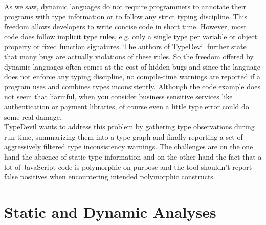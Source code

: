 \documentclass[runningheads,a4paper]{llncs}
\begin{document}
As we saw, dynamic languages do not require programmers to annotate their programs with type information or to follow any strict typing discipline. 
This freedom allows developers to write concise code in short time. 
However, most code does follow implicit type rules, e.g. only a single type per variable or object property or fixed function signatures.
The authors of TypeDevil further state that many bugs are actually violations of these rules.
So the freedom offered by dynamic languages often comes at the cost of hidden bugs and since the language does not enforce any typing discipline, no compile-time warnings are reported if a program uses and combines types inconsistently.
Although the code example does not seem that harmful, when you consider business sensitive services like authentication or payment libraries, of course even a little type error could do some real damage. \\
TypeDevil wants to address this problem by gathering type observations during run-time, summarizing them into a type graph and finally reporting a set of aggressively filtered type inconsistency warnings.
The challenges are on the one hand the absence of static type information and on the other hand the fact that a lot of JavaScript code is polymorphic on purpose and the tool shouldn't report false positives when encountering intended polymorphic constructs.

\section{Static and Dynamic Analyses} \label{staticDynamicAnalysis}
\end{document}
